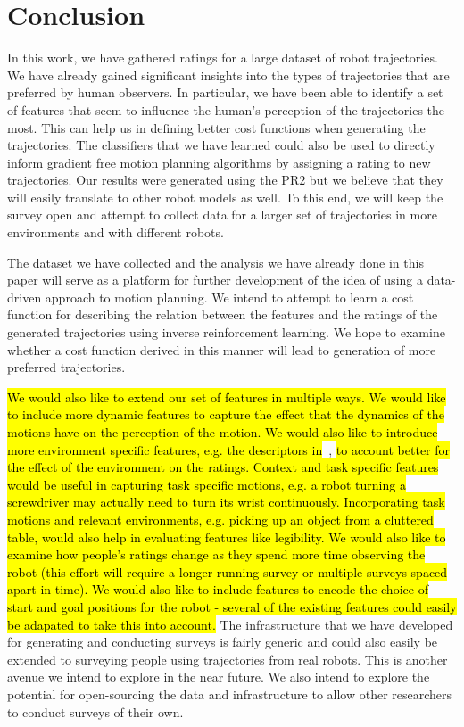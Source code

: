 \documentclass[letterpaper, 10 pt, conference]{ieeeconf}  %
\begin{document}
\section{Conclusion}
\label{sec:conclusion}
In this work, we have gathered ratings for a large dataset of robot trajectories. We have already gained significant insights into the 
types of trajectories that are preferred by human observers. In particular, we have been able to identify a set of features that seem to influence 
the human's perception of the trajectories the most. This can help us in defining better cost functions when generating the trajectories. The classifiers 
that we have learned could also be used to directly inform gradient free motion planning algorithms by assigning a rating to new trajectories. Our 
results were generated using the PR2 but we believe that they will easily translate to other robot models as well. To this end, 
we will keep the survey open and attempt to collect data for a larger set of trajectories in 
more environments and with different robots. 

The dataset we have collected and the analysis we have already done in this paper will serve as a
 platform for further development of the idea of using 
a data-driven approach to motion planning. We intend to attempt to learn a cost function for describing the relation between the features and 
the ratings of the generated trajectories using inverse reinforcement learning. We hope to examine whether a cost function derived in this manner will 
lead to generation of more preferred trajectories. 

\hl{We would also like to extend our set of features in multiple ways. We would like to include more dynamic features to capture the effect 
that the dynamics of the motions have on the perception of the motion. We would also like to introduce more environment specific features, e.g. the descriptors in}~\cite{10-jetchev-ICRA}, \hl{to account better for the effect of the environment on the ratings. Context and task specific features would be useful in capturing task specific motions, e.g. a robot turning a screwdriver may actually need to turn its wrist continuously. Incorporating task motions and relevant environments, e.g. picking up an object from a cluttered table, would also help in evaluating features like legibility. We would also like to examine how people's ratings change as they spend more time observing the robot (this effort will require a longer running survey or multiple surveys spaced apart in time). We would also like to include features to encode the choice of start and goal positions for the robot - several of the existing features could easily be adapated to take this into account.} The infrastructure that we have developed for generating and conducting 
surveys is fairly generic and could also easily be extended to surveying people using trajectories from real robots. This is another avenue we intend to explore 
in the near future. We also intend to explore the potential for open-sourcing the data and infrastructure to allow other researchers to conduct surveys of their own. 
\end{document}
